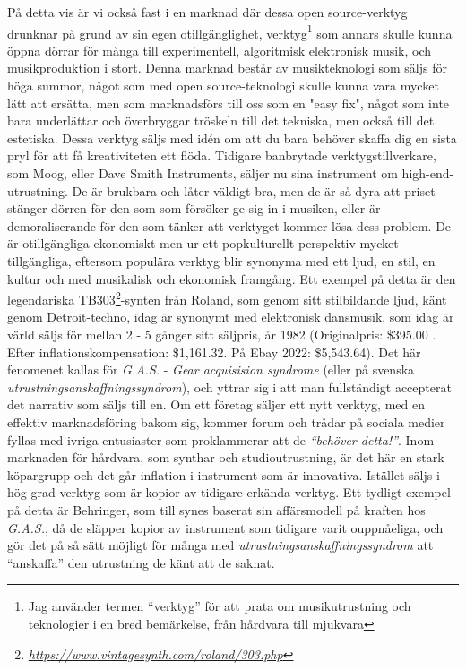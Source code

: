\documentclass{article}
\begin{document}
På detta vis är vi också fast i en marknad där dessa open source-verktyg drunknar på grund av sin egen
otillgänglighet, verktyg\footnote{Jag använder termen ``verktyg'' för att prata om musikutrustning och
teknologier i en bred bemärkelse, från hårdvara till mjukvara} som annars skulle kunna öppna dörrar för många
till experimentell, algoritmisk elektronisk musik, och musikproduktion i stort. Denna marknad består av musikteknologi som säljs för höga summor, något som med open
source-teknologi skulle kunna vara mycket lätt att ersätta, men som marknadsförs till oss som en "easy fix",
något som inte bara underlättar och överbryggar tröskeln till det tekniska, men också till det estetiska.
Dessa verktyg säljs med idén om att du bara behöver skaffa dig en sista pryl för att få
kreativiteten ett flöda.
Tidigare banbrytade verktygstillverkare, som Moog, eller Dave Smith Instruments, säljer nu sina instrument
om high-end-utrustning. De är brukbara och låter väldigt bra, men de är så dyra att priset stänger dörren för
den som som försöker ge sig in i musiken, eller är demoraliserande för den som tänker att verktyget kommer
lösa dess problem. De är otillgängliga ekonomiskt men ur ett popkulturellt perspektiv mycket tillgängliga,
eftersom populära verktyg blir synonyma med ett ljud, en stil, en kultur och med musikalisk och ekonomisk
framgång. Ett exempel på detta är den legendariska TB303\footnote{\emph{\url{https://www.vintagesynth.com/roland/303.php}}}-synten från Roland, som genom sitt
stilbildande ljud, känt genom Detroit-techno, idag är synonymt med elektronisk dansmusik, som idag är värld
säljs för mellan 2 - 5 gånger sitt säljpris, år 1982 (Originalpris: \$395.00 . Efter inflationskompensation:
\$1,161.32. På Ebay 2022: \$5,543.64). Det här fenomenet kallas för \emph{G.A.S.} - \emph{Gear acquisision
syndrome} (eller på svenska \emph{utrustningsanskaffningssyndrom}), och yttrar sig i att man fullständigt
accepterat det narrativ som säljs till en. Om ett företag säljer ett nytt verktyg, med en effektiv
marknadsföring bakom sig, kommer forum och trådar på sociala medier fyllas med ivriga entusiaster som
proklammerar att de \emph{``behöver detta!''}. Inom marknaden för hårdvara, som synthar och studioutrustning, är
det här en stark köpargrupp och det går inflation i instrument som är innovativa. Istället säljs i hög grad
verktyg som är kopior av tidigare erkända verktyg. Ett tydligt exempel på detta är Behringer, som till synes
baserat sin affärsmodell på kraften hos \emph{G.A.S.}, då de släpper kopior av instrument som tidigare varit
ouppnåeliga, och gör det på så sätt möjligt för många med \emph{utrustningsanskaffningssyndrom} att
``anskaffa'' den utrustning de känt att de saknat.
\end{document}
